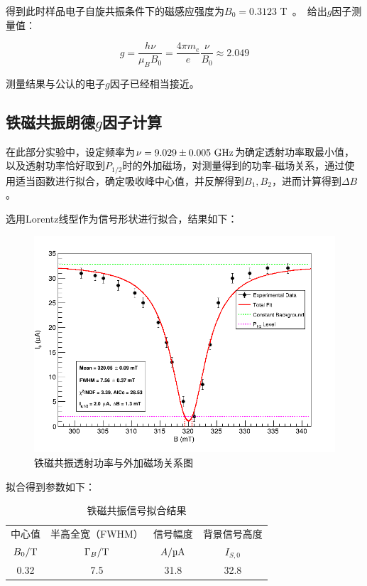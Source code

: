 \documentclass{thuemp}
\begin{document}
    得到此时样品电子自旋共振条件下的磁感应强度为$B_0 = 0.3123$ \si\tesla。给出$g$因子测量值：
    
    \begin{equation}
    g = \frac{h \nu}{\mu_B B_0} = \frac{4\pi m_e}{e} \frac{\nu}{B_0}\approx 2.049
    \end{equation}
    
    测量结果与公认的电子$g$因子已经相当接近。
    
    \subsection{铁磁共振朗德$g$因子计算}
    
    在此部分实验中，设定频率为$\nu = 9.029 \pm 0.005~\text{\si{\giga \hertz}}$为确定透射功率取最小值，以及透射功率恰好取到$P_{1/2}$时的外加磁场，对测量得到的功率-磁场关系，通过使用适当函数进行拟合，确定吸收峰中心值，并反解得到$B_1, B_2$，进而计算得到$\Delta B$。
    
    选用Lorentz线型作为信号形状进行拟合，结果如下：
    
    \begin{figure}[H]
        \centering
        \includegraphics[width=0.9\linewidth]{../Data/FMR_ConstantBg_LorentzPeak.png}
        \caption{铁磁共振透射功率与外加磁场关系图} \label{fig:gmr_gradient}
    \end{figure}
    
    拟合得到参数如下：
    
    \begin{table}[H]
        \centering
        \captionnamefont{\wuhao\bf\heiti}
        \captiontitlefont{\wuhao\bf\heiti}
        \caption{铁磁共振信号拟合结果} \label{tab:FMR_fit}
        \liuhao
        \begin{tabular}{cccc}
            \toprule
            中心值 & 半高全宽（FWHM） & 信号幅度 & 背景信号高度 \\
            $B_0/\text{\si\tesla}$ & $\Gamma_B/\text{\si\tesla}$ & $A/\text{\si{\micro\ampere}}$ & $I_{S,0}$\\
            \midrule
            0.32 & 7.5 & 31.8 & 32.8 \\
            \bottomrule
        \end{tabular}
    \end{table}
    
\end{document}
